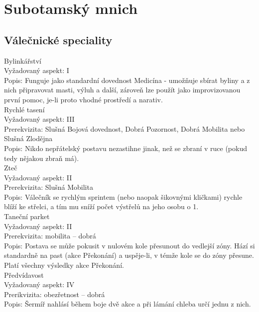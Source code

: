 
\section{Subotamský mnich}
\label{sec:subatom}

\subsection{Válečnické speciality}
\label{sec:val-spec-sub}

Bylinkářství \\
Vyžadovaný aspekt: I\\
Popis: Funguje jako standardní dovednost Medicína - umožňuje sbírat byliny a z nich připravovat masti, výluh a další, zároveň lze použít jako improvizovanou první pomoc, je-li proto vhodné prostředí a narativ.\\


Rychlé tasení\\
Vyžadovaný aspekt: III\\
Prerekvizita: Slušná Bojová dovednost, Dobrá Pozornost, Dobrá Mobilita nebo Slušná Zlodějna \\
Popis: Nikdo nepřátelský postavu nezastihne jinak, než se zbraní v ruce (pokud tedy nějakou zbraň má).\\


Zteč \\
Vyžadovaný aspekt: II\\
Prerekvizita: Slušná Mobilita\\
Popis: Válečník se rychlým sprintem (nebo naopak šikovnými kličkami) rychle blíží ke střelci, a tím mu sníží počet výstřelů na jeho osobu o 1.\\


Taneční parket \\
Vyžadovaný aspekt: II\\
Prerekvizita: mobilita – dobrá\\
Popis: Postava se může pokusit v nulovém kole přesunout do vedlejší zóny. Hází si standardně na past (akce Překonání) a uspěje-li, v témže kole se do zóny přesune. Platí všechny výsledky akce Překonání.\\


Předvídavost \\
Vyžadovaný aspekt: IV\\
Prerikvizita: obezřetnost – dobrá\\
Popis: Šermíř nahlásí během boje dvě akce a při lámání chleba určí jednu z nich. \\



